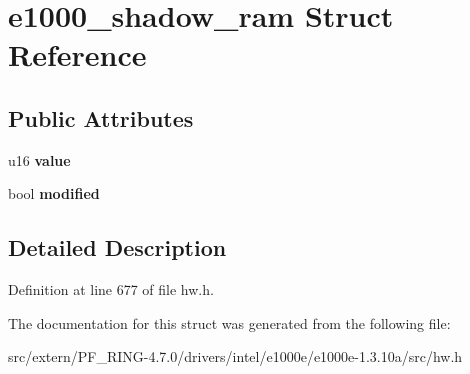 \hypertarget{structe1000__shadow__ram}{
\section{e1000\_\-shadow\_\-ram Struct Reference}
\label{structe1000__shadow__ram}
}
\subsection*{Public Attributes}
\begin{DoxyCompactItemize}
\item 
\hypertarget{structe1000__shadow__ram_a2c7bdfe0eefe64b52c1ed60cb10f10fe}{
u16 {\bfseries value}}
\label{structe1000__shadow__ram_a2c7bdfe0eefe64b52c1ed60cb10f10fe}

\item 
\hypertarget{structe1000__shadow__ram_a4f68cedc3d6153e5d8270962958b799e}{
bool {\bfseries modified}}
\label{structe1000__shadow__ram_a4f68cedc3d6153e5d8270962958b799e}

\end{DoxyCompactItemize}


\subsection{Detailed Description}


Definition at line 677 of file hw.h.



The documentation for this struct was generated from the following file:\begin{DoxyCompactItemize}
\item 
src/extern/PF\_\-RING-\/4.7.0/drivers/intel/e1000e/e1000e-\/1.3.10a/src/hw.h\end{DoxyCompactItemize}

